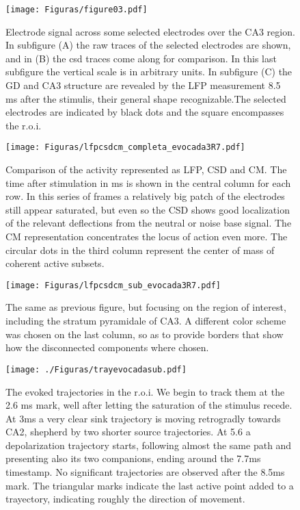 
\begin{figure}[h!]
   \centering
   \texttt{[image: Figuras/figure03.pdf]}
   \caption{
      Electrode signal across some selected electrodes over the CA3 region.     
      In subfigure (A)
      the raw traces of the selected electrodes are shown, and in (B) the
      csd traces come along for comparison. In this last subfigure the
      vertical scale is in arbitrary units.
      In subfigure (C)  the GD and CA3 structure are revealed
      by the LFP measurement 8.5 ms after the stimulis,
      their general shape recognizable.The selected electrodes are indicated
      by black dots and the square encompasses the r.o.i. 
   }
  \label{trazselectevo}
\end{figure}



\begin{figure}[h!]
  \captionsetup{singlelinecheck=off} 
  \texttt{[image: Figuras/lfpcsdcm\_completa\_evocada3R7.pdf]}
\caption[tu abueala]{
  Comparison of the activity represented as LFP, CSD and CM.
  The time after
  stimulation in ms is shown in the central column for each row.
  In this series of frames a relatively big patch of the electrodes
  still appear saturated, but even so the CSD shows good localization
  of the relevant deflections from the neutral or noise base signal.
  The CM representation concentrates the locus of action even more.
  The circular dots in the third column represent the center of mass
  of coherent active subsets.
}\label{lfpcsdcm}
\end{figure}



\begin{figure}[h!]
   \captionsetup{singlelinecheck=off} 
   \texttt{[image: Figuras/lfpcsdcm\_sub\_evocada3R7.pdf]} 
   \caption[test]{
     The same as previous figure, but focusing on the
  region of interest, including the stratum pyramidale of CA3. A different
  color scheme was chosen on the last column, so as to provide borders
  that show how the disconnected components where chosen. 
}\label{lfpcsdcmsub}
\end{figure}



\begin{figure}[h!]
   \captionsetup{singlelinecheck=off} 
 \texttt{[image: ./Figuras/trayevocadasub.pdf]}
 \caption[test]{
   The evoked trajectories in the r.o.i. We begin to track them
    at the 2.6 ms mark, well after letting the saturation of the stimulus recede.
    At 3ms a very clear sink trajectory is moving retrogradly towards CA2,
    shepherd by two shorter source trajectories. At 5.6 a depolarization
    trajectory starts, following almost the same path and presenting also its
    two companions, ending around the 7.7ms timestamp. No significant
    trajectories are observed after the 8.5ms mark. The triangular
    marks indicate the last active point added to a trayectory, indicating
    roughly the direction of movement.
 }\label{evotracks}
\end{figure}


